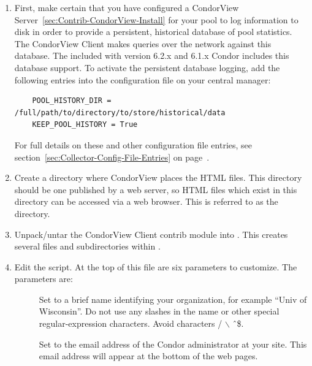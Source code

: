 \begin{enumerate}

\item First, make certain that you have configured a CondorView 
Server~\ref{sec:Contrib-CondorView-Install}
for your pool to log information to disk in order to provide a persistent,
historical database of pool statistics.
The CondorView Client makes queries over the network against this
database.  The  included with version 6.2.x and 6.1.x
Condor includes this database support.
To activate the persistent database logging, add the following entries into
the configuration file on your central manager: 
\begin{verbatim}
    POOL_HISTORY_DIR = /full/path/to/directory/to/store/historical/data 
    KEEP_POOL_HISTORY = True 
\end{verbatim}
For full details on these and other  configuration file
entries, see section~\ref{sec:Collector-Config-File-Entries} on
page~\pageref{sec:Collector-Config-File-Entries}.

\item Create a directory where CondorView places the
HTML files.  
This directory should be one published by a web server, so HTML
files which exist in this directory can be accessed via a web browser.  
This is referred to as the  directory.

\item Unpack/untar the CondorView Client contrib module into .
This creates several files and subdirectories within .

\item Edit the \MakeStats script.  At the top of this file are six parameters
to customize.  The parameters are:

        \begin{description}

	\item[] Set to a brief name identifying
	your organization, for example ``Univ of Wisconsin''.  Do not
	use any slashes in the name or other special regular-expression
	characters. Avoid characters / $\backslash$ \^\ \$.

	\item[] Set to the email
	address of the Condor administrator at your site.  
	This email address will appear at the bottom of the web pages.


\end{description}
\end{enumerate}
